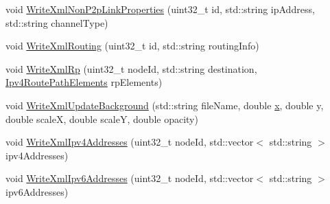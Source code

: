 \begin{DoxyCompactItemize}
\item 
void \hyperlink{classns3_1_1AnimationInterface_a94c31cf6818ca7ef58571761a5640137}{Write\+Xml\+Non\+P2p\+Link\+Properties} (uint32\+\_\+t id, std\+::string ip\+Address, std\+::string channel\+Type)
\item 
void \hyperlink{classns3_1_1AnimationInterface_a23e83b186cb58b87dce973c8ee3dd0bb}{Write\+Xml\+Routing} (uint32\+\_\+t id, std\+::string routing\+Info)
\item 
void \hyperlink{classns3_1_1AnimationInterface_aa4bfb211be7de2540f558481d888b033}{Write\+Xml\+Rp} (uint32\+\_\+t node\+Id, std\+::string destination, \hyperlink{classns3_1_1AnimationInterface_a7c7711cf651506df80a9eb3026603c52}{Ipv4\+Route\+Path\+Elements} rp\+Elements)
\item 
void \hyperlink{classns3_1_1AnimationInterface_ad1ced65e3b97eb485d40bf6644e843f4}{Write\+Xml\+Update\+Background} (std\+::string file\+Name, double \hyperlink{lte__link__budget__x2__handover__measures_8m_a9336ebf25087d91c818ee6e9ec29f8c1}{x}, double y, double scaleX, double scaleY, double opacity)
\item 
void \hyperlink{classns3_1_1AnimationInterface_abbb985d4e30f28a14a68db52d4c5caf0}{Write\+Xml\+Ipv4\+Addresses} (uint32\+\_\+t node\+Id, std\+::vector$<$ std\+::string $>$ ipv4\+Addresses)
\item 
void \hyperlink{classns3_1_1AnimationInterface_af4ad6223ac4a80fcf3cbaaa3fba64e15}{Write\+Xml\+Ipv6\+Addresses} (uint32\+\_\+t node\+Id, std\+::vector$<$ std\+::string $>$ ipv6\+Addresses)
\end{DoxyCompactItemize}
